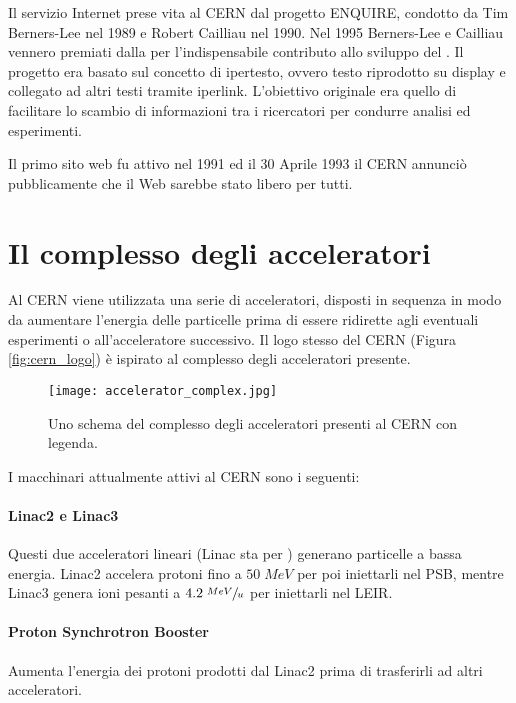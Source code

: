 			Il servizio Internet  prese vita al \ac{CERN} dal progetto ENQUIRE, condotto da Tim Berners-Lee nel 1989 e Robert Cailliau nel 1990. Nel 1995 Berners-Lee e Cailliau vennero premiati dalla  per l'indispensabile contributo allo sviluppo del . Il progetto era basato sul concetto di ipertesto, ovvero testo riprodotto su display e collegato ad altri testi tramite iperlink. L'obiettivo originale era quello di facilitare lo scambio di informazioni tra i ricercatori per condurre analisi ed esperimenti.
			
			Il primo sito web fu attivo nel 1991 ed il 30 Aprile 1993 il \ac{CERN} annunciò pubblicamente che il Web sarebbe stato libero per tutti.
			
	\section{Il complesso degli acceleratori} \label{sec:C;acceleratori}
	
		Al \ac{CERN} viene utilizzata una serie di acceleratori, disposti in sequenza in modo da aumentare l'energia delle particelle prima di essere ridirette agli eventuali esperimenti o all'acceleratore successivo. Il logo stesso del \ac{CERN} (Figura \ref{fig:cern_logo}) è ispirato al complesso degli acceleratori presente.
			
		\begin{figure}[h!]
			\begin{center}
				\texttt{[image: accelerator\_complex.jpg]}
			\end{center}
			\caption[Complesso degli acceleratori]{Uno schema del complesso degli acceleratori presenti al CERN con legenda.}
			\label{fig:accelerator_complex}
		\end{figure}
		
		I macchinari attualmente attivi al \ac{CERN} sono i seguenti:
		
		\paragraph{Linac2 e Linac3}Questi due acceleratori lineari (\acs{Linac} sta per ) generano particelle a bassa energia. Linac2 accelera protoni fino a $50 \; MeV$ per poi iniettarli nel \ac{PSB}, mentre Linac3 genera ioni pesanti a $4.2 \; \sfrac{MeV}{u}$ per iniettarli nel \ac{LEIR}.
		
		\paragraph{Proton Synchrotron Booster}Aumenta l'energia dei protoni prodotti dal Linac2 prima di trasferirli ad altri acceleratori.
		

